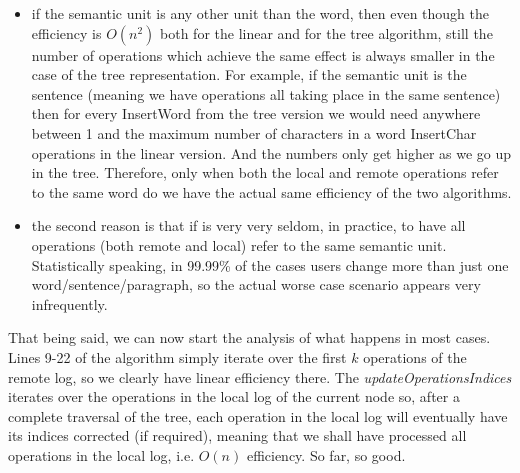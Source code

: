 \begin{itemize}
\item if the semantic unit is any other unit than the word, then even though the efficiency is $O(n^2)$ both
      for the linear and for the tree algorithm, still the number of operations which achieve the same effect
      is always smaller in the case of the tree representation. For example, if the semantic unit is the sentence
      (meaning we have operations all taking place in the same sentence) then for every InsertWord from the
      tree version we would need anywhere between 1 and the maximum number of characters in a word InsertChar
      operations in the linear version. And the numbers only get higher as we go up in the tree. Therefore,
      only when both the local and remote operations refer to the same word do we have the actual same efficiency
      of the two algorithms.
\item the second reason is that if is very very seldom, in practice, to have all operations (both remote and
      local) refer to the same semantic unit. Statistically speaking, in 99.99\% of the cases users change
      more than just one word/sentence/paragraph, so the actual worse case scenario appears very infrequently.
\end{itemize}

That being said, we can now start the analysis of what happens in most cases. Lines 9-22 of the algorithm
simply iterate over the first $k$ operations of the remote log, so we clearly have linear efficiency there.
The \emph{updateOperationsIndices} iterates over the operations in the local log of the current node so,
after a complete traversal of the tree, each operation in the local log will eventually have its indices
corrected (if required), meaning that we shall have processed all operations in the local log, i.e. $O(n)$
efficiency. So far, so good.

